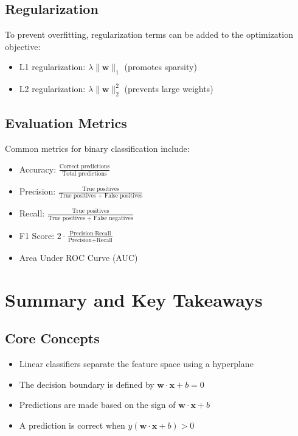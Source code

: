 \documentclass{article}
\begin{document}
\subsection{Regularization}
To prevent overfitting, regularization terms can be added to the optimization objective:
\begin{itemize}
    \item L1 regularization: $\lambda \|\mathbf{w}\|_1$ (promotes sparsity)
    \item L2 regularization: $\lambda \|\mathbf{w}\|_2^2$ (prevents large weights)
\end{itemize}

\subsection{Evaluation Metrics}
Common metrics for binary classification include:
\begin{itemize}
    \item Accuracy: $\frac{\text{Correct predictions}}{\text{Total predictions}}$
    \item Precision: $\frac{\text{True positives}}{\text{True positives + False positives}}$
    \item Recall: $\frac{\text{True positives}}{\text{True positives + False negatives}}$
    \item F1 Score: $2 \cdot \frac{\text{Precision} \cdot \text{Recall}}{\text{Precision} + \text{Recall}}$
    \item Area Under ROC Curve (AUC)
\end{itemize}

\section{Summary and Key Takeaways}

\subsection{Core Concepts}
\begin{itemize}
    \item Linear classifiers separate the feature space using a hyperplane
    \item The decision boundary is defined by $\mathbf{w} \cdot \mathbf{x} + b = 0$
    \item Predictions are made based on the sign of $\mathbf{w} \cdot \mathbf{x} + b$
    \item A prediction is correct when $y(\mathbf{w} \cdot \mathbf{x} + b) > 0$
\end{itemize}
\end{document}
